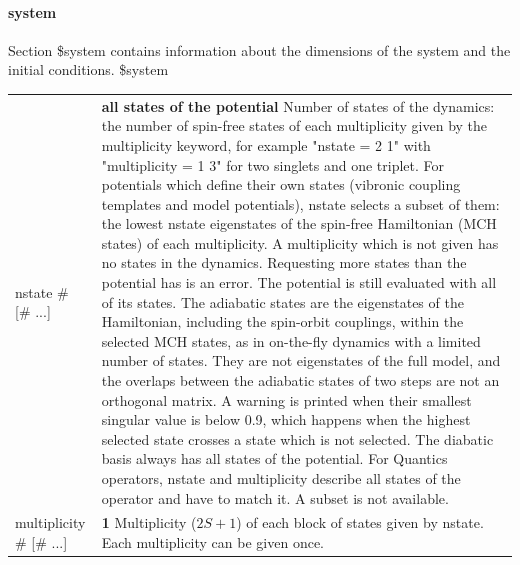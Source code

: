 \documentclass{report}
\begin{document}
\paragraph{system}
Section \$system contains information about the dimensions of the system and the initial conditions. \newline
\$system

\begin{tabularx}{\textwidth}{ m{2.5cm} X }
nstate \# [\# ...]		&
    \textbf{all states of the potential} \newline
    Number of states of the dynamics: the number of spin-free states of each multiplicity given by the multiplicity keyword, for example "nstate = 2 1" with "multiplicity = 1 3" for two singlets and one triplet. \newline
    For potentials which define their own states (vibronic coupling templates and model potentials), nstate selects a subset of them: the lowest nstate eigenstates of the spin-free Hamiltonian (MCH states) of each multiplicity. A multiplicity which is not given has no states in the dynamics. Requesting more states than the potential has is an error. The potential is still evaluated with all of its states. The adiabatic states are the eigenstates of the Hamiltonian, including the spin-orbit couplings, within the selected MCH states, as in on-the-fly dynamics with a limited number of states. They are not eigenstates of the full model, and the overlaps between the adiabatic states of two steps are not an orthogonal matrix. A warning is printed when their smallest singular value is below 0.9, which happens when the highest selected state crosses a state which is not selected. The diabatic basis always has all states of the potential. \newline
    For Quantics operators, nstate and multiplicity describe all states of the operator and have to match it. A subset is not available.  \\

multiplicity \# [\# ...]		&
    \textbf{1} \newline
    Multiplicity ($2S+1$) of each block of states given by nstate. Each multiplicity can be given once.  \\


\end{tabularx}
\end{document}
